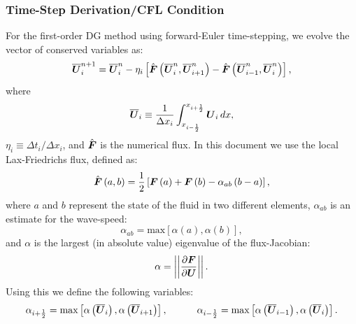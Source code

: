 \documentclass[10pt,preprint]{aastex}
\begin{document}
\subsubsection{Time-Step Derivation/CFL Condition}
For the first-order DG method using forward-Euler time-stepping, we evolve the vector of conserved variables as:
\begin{equation}\label{Eq:1stOrderDG}
    \overline{\boldsymbol{U}}^{n+1}_{i}=\overline{\boldsymbol{U}}^{n}_{i}-\eta_{i}\left[\hat{\boldsymbol{F}}\left(\overline{\boldsymbol{U}}^{n}_{i},\overline{\boldsymbol{U}}^{n}_{i+1}\right)-\hat{\boldsymbol{F}}\left(\overline{\boldsymbol{U}}^{n}_{i-1},\overline{\boldsymbol{U}}^{n}_{i}\right)\right],
\end{equation}
where
\begin{equation}
    \overline{\boldsymbol{U}}_{i}\equiv\frac{1}{\Delta x_{i}}\int_{x_{i-\frac{1}{2}}}^{x_{i+\frac{1}{2}}}\boldsymbol{U}_{i}\,dx,
\end{equation}
$\eta_{i}\equiv\Delta t_{i}/\Delta x_{i}$, and $\hat{\boldsymbol{F}}$ is the numerical flux. In this document we use the local Lax-Friedrichs flux, defined as:
\begin{equation}\label{Eq:LLF}
    \hat{\boldsymbol{F}}\left(a,b\right)=\frac{1}{2}\left[\boldsymbol{F}\left(a\right)+\boldsymbol{F}\left(b\right) - \alpha_{ab}\left(b-a\right)\right],
\end{equation}
where $a$ and $b$ represent the state of the fluid in two different elements, $\alpha_{ab}$ is an estimate for the wave-speed:
\begin{equation}
    \alpha_{ab}=\text{max}\left[\alpha\left(a\right),\alpha\left(b\right)\right],
\end{equation}
and $\alpha$ is the largest (in absolute value) eigenvalue of the flux-Jacobian:
\begin{equation}
    \alpha=\left|\left|\frac{\partial\boldsymbol{F}}{\partial\boldsymbol{U}}\right|\right|.
\end{equation}
Using this we define the following variables:
\begin{equation}\label{Eq:EigVals}
    \alpha_{i+\frac{1}{2}}=\text{max}\left[\alpha\left(\overline{\boldsymbol{U}}_{i}\right),\alpha\left(\overline{\boldsymbol{U}}_{i+1}\right)\right],\hspace{3em} \alpha_{i-\frac{1}{2}}=\text{max}\left[\alpha\left(\overline{\boldsymbol{U}}_{i-1}\right),\alpha\left(\overline{\boldsymbol{U}}_{i}\right)\right].
\end{equation}
\end{document}
